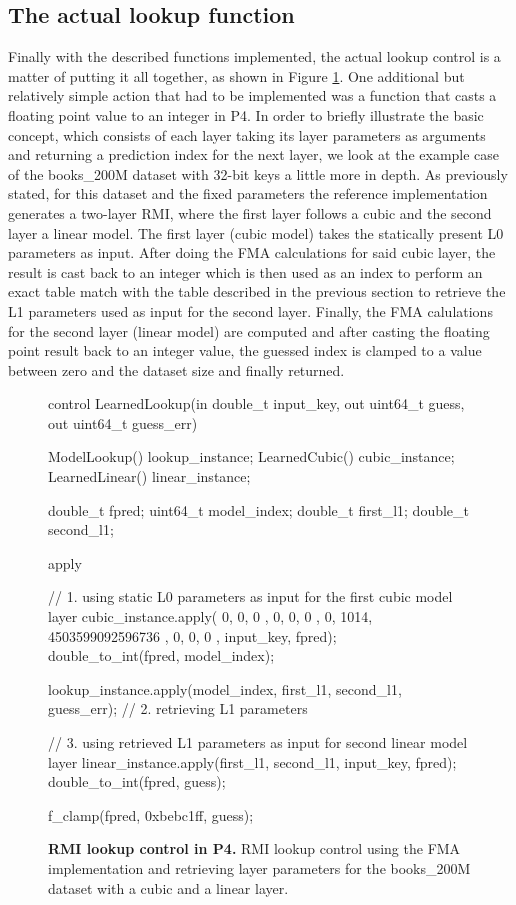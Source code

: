 \subsection{The actual lookup function}
Finally with the described functions implemented, the actual lookup control is a matter of putting it all together, as shown in Figure \ref{fig:rmi_lookup_func}. One additional but relatively simple action that had to be implemented was a function that casts a floating point value to an integer in P4. In order to briefly illustrate the basic concept, which consists of each layer taking its layer parameters as arguments and returning a prediction index for the next layer, we look at the example case of the books\_200M dataset with 32-bit keys a little more in depth. As previously stated, for this dataset and the fixed parameters the reference implementation generates a two-layer RMI, where the first layer follows a cubic and the second layer a linear model. The first layer (cubic model) takes the statically present L0 parameters as input. After doing the FMA calculations for said cubic layer, the result is cast back to an integer which is then used as an index to perform an exact table match with the table described in the previous section to retrieve the L1 parameters used as input for the second layer. Finally, the FMA calulations for the second layer (linear model) are computed and after casting the floating point result back to an integer value, the guessed index is clamped to a value between zero and the dataset size and finally returned.

\begin{figure}[ht]
  \begin{P4}
  control LearnedLookup(in double_t input_key, out uint64_t guess, out uint64_t guess_err) {
    ModelLookup() lookup_instance;
    LearnedCubic() cubic_instance;
    LearnedLinear() linear_instance;

    double_t fpred;
    uint64_t model_index;
    double_t first_l1; double_t second_l1;

    apply {
      // 1. using static L0 parameters as input for the first cubic model layer
      cubic_instance.apply({ 0, 0, 0 }, { 0, 0, 0 }, { 0, 1014, 4503599092596736 }, { 0, 0, 0 }, input_key, fpred);
      double_to_int(fpred, model_index);

      lookup_instance.apply(model_index, first_l1, second_l1, guess_err); // 2. retrieving L1 parameters

      // 3. using retrieved L1 parameters as input for second linear model layer
      linear_instance.apply(first_l1, second_l1, input_key, fpred);
      double_to_int(fpred, guess);

      f_clamp(fpred, 0xbebc1ff, guess);
    }
  }\end{P4}
  \caption[RMI lookup control in P4]{
    \textbf{RMI lookup control in P4.} RMI lookup control using the FMA implementation and retrieving layer parameters for the books\_200M dataset with a cubic and a linear layer.
  }
  \label{fig:rmi_lookup_func}
\end{figure}


